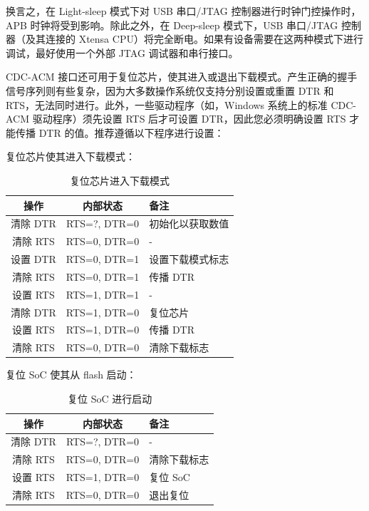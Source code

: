 \documentclass[main\_\_CN.tex]{subfiles}
\begin{document}
换言之，在 Light-sleep 模式下对 USB 串口/JTAG 控制器进行时钟门控操作时，APB 时钟将受到影响。除此之外，在 Deep-sleep 模式下，USB 串口/JTAG 控制器（及其连接的 Xtensa CPU）将完全断电。如果有设备需要在这两种模式下进行调试，最好使用一个外部 JTAG 调试器和串行接口。

CDC-ACM 接口还可用于复位芯片，使其进入或退出下载模式。产生正确的握手信号序列则有些复杂，因为大多数操作系统仅支持分别设置或重置 DTR 和 RTS，无法同时进行。此外，一些驱动程序（如，Windows 系统上的标准 CDC-ACM 驱动程序）须先设置 RTS 后才可设置 DTR，因此您必须明确设置 RTS 才能传播 DTR 的值。推荐遵循以下程序进行设置：

复位芯片使其进入下载模式：

\begin{table}[H]
    \centering
    \caption{复位芯片进入下载模式}
    \label{tab:usbserialjtag-reset-soc-into-download-mode}
    \begin{tabular} {|c|c|l|}
    \hline
        \rowcolor{lightgray}
        \textbf{操作} & \textbf{内部状态} & \textbf{备注} \\\hline

        清除 DTR & RTS=?, DTR=0 & 初始化以获取数值 \\\hline
        清除 RTS & RTS=0, DTR=0 & - \\\hline
        设置 DTR & RTS=0, DTR=1 & 设置下载模式标志 \\\hline
        清除 RTS & RTS=0, DTR=1 & 传播 DTR \\\hline
        设置 RTS & RTS=1, DTR=1 & - \\\hline
        清除 DTR & RTS=1, DTR=0 & 复位芯片 \\\hline
        设置 RTS & RTS=1, DTR=0 & 传播 DTR \\\hline
        清除 RTS & RTS=0, DTR=0 & 清除下载标志\\\hline
    \end{tabular}
\end{table}

复位 SoC 使其从 flash 启动：

\begin{table}[H]
    \centering
    \caption{复位 SoC 进行启动}
    \label{tab:usbserialjtag-reset-soc-into-booting}
    \begin{tabular} {|c|c|l|}
    \hline
        \rowcolor{lightgray}
        \textbf{操作} & \textbf{内部状态} & \textbf{备注} \\\hline

        清除 DTR & RTS=?, DTR=0 & - \\\hline
        清除 RTS & RTS=0, DTR=0 &  清除下载标志 \\\hline
        设置 RTS & RTS=1, DTR=0 &  复位 SoC \\\hline
        清除 RTS & RTS=0, DTR=0 & 退出复位 \\\hline
    \end{tabular}
\end{table}
\end{document}
